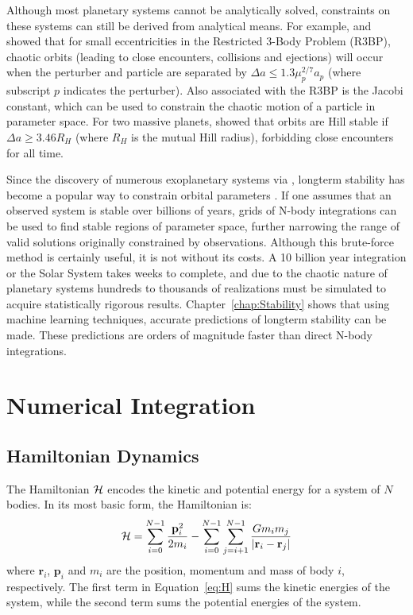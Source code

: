 Although most planetary systems cannot be analytically solved, constraints on these systems can still be derived from analytical means.
For example, \citet{Wisdom1980} and \citet{Duncan1989} showed that for small eccentricities in the Restricted 3-Body Problem (R3BP), chaotic orbits (leading to close encounters, collisions and ejections) will occur when the perturber and particle are separated by $\Delta a \le 1.3\mu_p^{2/7}a_p$ (where subscript $p$ indicates the perturber). 
Also associated with the R3BP is the Jacobi constant, which can be used to constrain the chaotic motion of a particle in parameter space. 
For two massive planets, \citet{Gladman1993} showed that orbits are Hill stable if $\Delta a \ge 3.46 R_H$ (where $R_H$ is the mutual Hill radius), forbidding close encounters for all time.

Since the discovery of numerous exoplanetary systems via \kep, longterm stability has become a popular way to constrain orbital parameters \citep{Lissauer2011, Steffen2013, Jontof-Hutter2014, Tamayo2015}. 
If one assumes that an observed system is stable over billions of years, grids of N-body integrations can be used to find stable regions of parameter space, further narrowing the range of valid solutions originally constrained by observations. 
Although this brute-force method is certainly useful, it is not without its costs. 
A 10 billion year integration or the Solar System takes weeks to complete, and due to the chaotic nature of planetary systems hundreds to thousands of realizations must be simulated to acquire statistically rigorous results. 
Chapter~\ref{chap:Stability} shows that using machine learning techniques, accurate predictions of longterm stability can be made. 
These predictions are orders of magnitude faster than direct N-body integrations. 

\section{Numerical Integration}
\subsection{Hamiltonian Dynamics}
The Hamiltonian $\mathcal{H}$ encodes the kinetic and potential energy for a system of $N$ bodies. 
In its most basic form, the Hamiltonian is:
\begin{equation}
\mathcal{H}  = \sum_{i=0}^{N-1} \frac{\textbf{p}_i^2}{2m_i} - \sum_{i=0}^{N-1} \sum_{j=i+1}^{N-1} \frac{Gm_im_j}{|\textbf{r}_i - \textbf{r}_j|}
\label{eq:H}
\end{equation}
where $\textbf{r}_i$, $\textbf{p}_i$ and $m_i$ are the position, momentum and mass of body $i$, respectively. 
The first term in Equation~\ref{eq:H} sums the kinetic energies of the system, while the second term sums the potential energies of the system.

